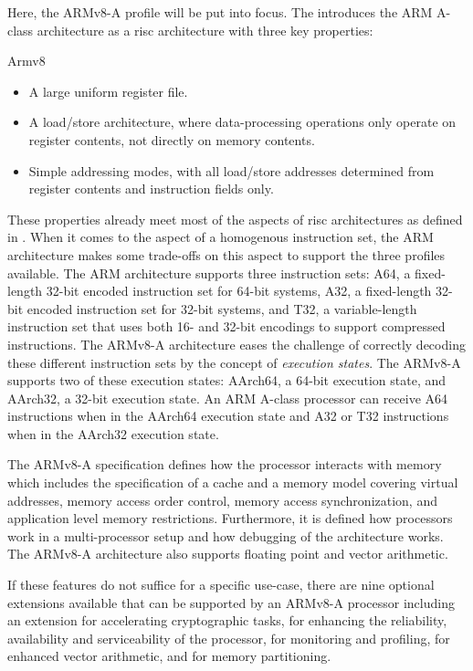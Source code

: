 Here, the ARMv8-A profile will be put into focus.
The  \cite{Armv8} introduces the ARM A-class architecture as a \gls{risc} architecture with three key properties:
\begin{displaycquote}[p.A1-34]{Armv8}
    \begin{itemize}
        \item A large uniform register file.
        \item A load/store architecture, where data-processing operations only operate on register contents, not directly on memory contents.
        \item Simple addressing modes, with all load/store addresses determined from register contents and instruction fields only.
    \end{itemize}
\end{displaycquote}

These properties already meet most of the aspects of \gls{risc} architectures as defined in \cite{Hennessy12}.
When it comes to the aspect of a homogenous instruction set, the ARM architecture makes some trade-offs on this aspect to support the three profiles available.
The ARM architecture supports three instruction sets: A64, a fixed-length 32-bit encoded instruction set for 64-bit systems, A32, a fixed-length 32-bit encoded instruction set for 32-bit systems, and T32, a variable-length instruction set that uses both 16- and 32-bit encodings to support compressed instructions.
The ARMv8-A architecture eases the challenge of correctly decoding these different instruction sets by the concept of \textit{execution states}.
The ARMv8-A supports two of these execution states: AArch64, a 64-bit execution state, and AArch32, a 32-bit execution state.
An ARM A-class processor can receive A64 instructions when in the AArch64 execution state and A32 or T32 instructions when in the AArch32 execution state.

The ARMv8-A specification defines how the processor interacts with memory which includes the specification of a cache and a memory model covering virtual addresses, memory access order control, memory access synchronization, and application level memory restrictions.
Furthermore, it is defined how processors work in a multi-processor setup and how debugging of the architecture works.
The ARMv8-A architecture also supports floating point and vector arithmetic.

If these features do not suffice for a specific use-case, there are nine optional extensions available that can be supported by an ARMv8-A processor including an extension for accelerating cryptographic tasks, for enhancing the reliability, availability and serviceability of the processor, for monitoring and profiling, for enhanced vector arithmetic, and for memory partitioning.

